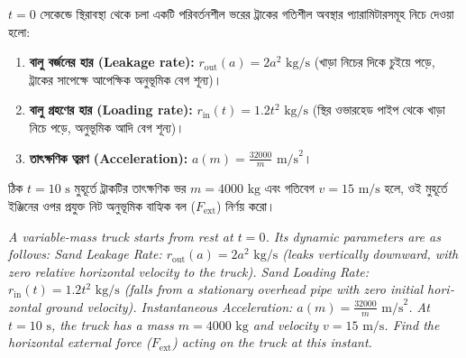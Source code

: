 \documentclass[12pt, a4paper]{article}
\begin{document}
\begin{tcolorbox}[questionbox={প্রশ্ন (Question) 17}]
\noindent
$t = 0$ সেকেন্ডে স্থিরাবস্থা থেকে চলা একটি পরিবর্তনশীল ভরের ট্রাকের গতিশীল অবস্থার প্যারামিটারসমূহ নিচে দেওয়া হলো:
\begin{enumerate}
    \item \textbf{বালু বর্জনের হার (Leakage rate):} $r_{\text{out}}(a) = 2 a^2\text{ kg/s}$ (খাড়া নিচের দিকে চুইয়ে পড়ে, ট্রাকের সাপেক্ষে আপেক্ষিক অনুভূমিক বেগ শূন্য)।
    \item \textbf{বালু গ্রহণের হার (Loading rate):} $r_{\text{in}}(t) = 1.2 t^2\text{ kg/s}$ (স্থির ওভারহেড পাইপ থেকে খাড়া নিচে পড়ে, অনুভূমিক আদি বেগ শূন্য)।
    \item \textbf{তাৎক্ষণিক ত্বরণ (Acceleration):} $a(m) = \frac{32000}{m}\text{ m/s}^2$।
\end{enumerate}

\vspace{0.3em}
\noindent
ঠিক $t = 10\text{ s}$ মুহূর্তে ট্রাকটির তাৎক্ষণিক ভর $m = 4000\text{ kg}$ এবং গতিবেগ $v = 15\text{ m/s}$ হলে, ওই মুহূর্তে ইঞ্জিনের ওপর প্রযুক্ত নিট অনুভূমিক বাহ্যিক বল ($F_{\text{ext}}$) নির্ণয় করো।

\vspace{0.8em}
\begin{english}
\noindent\textit{\color{darkgray}
A variable-mass truck starts from rest at $t = 0$. Its dynamic parameters are as follows:
Sand Leakage Rate: $r_{\text{out}}(a) = 2 a^2\text{ kg/s}$ (leaks vertically downward, with zero relative horizontal velocity to the truck).
Sand Loading Rate: $r_{\text{in}}(t) = 1.2 t^2\text{ kg/s}$ (falls from a stationary overhead pipe with zero initial horizontal ground velocity).
Instantaneous Acceleration: $a(m) = \frac{32000}{m}\text{ m/s}^2$.
At $t = 10\text{ s}$, the truck has a mass $m = 4000\text{ kg}$ and velocity $v = 15\text{ m/s}$. Find the horizontal external force ($F_{\text{ext}}$) acting on the truck at this instant.
}
\end{english}
\end{tcolorbox}
\end{document}
